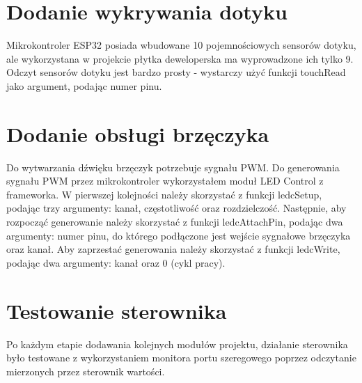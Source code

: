 \documentclass[11pt]{report}
\begin{document}
 \section{Dodanie wykrywania dotyku}
 Mikrokontroler ESP32 posiada wbudowane 10 pojemnościowych sensorów dotyku, ale wykorzystana w projekcie płytka deweloperska ma wyprowadzone ich tylko 9. Odczyt sensorów dotyku jest bardzo prosty - wystarczy użyć funkcji touchRead jako argument, podając numer pinu.
 
 \section{Dodanie obsługi brzęczyka}
 Do wytwarzania dźwięku brzęczyk potrzebuje sygnału PWM. Do generowania sygnału PWM przez mikrokontroler wykorzystałem moduł LED Control z frameworka. W pierwszej kolejności należy skorzystać z funkcji ledcSetup, podając trzy argumenty: kanał, częstotliwość oraz rozdzielczość. Następnie, aby rozpocząć generowanie należy skorzystać z funkcji ledcAttachPin, podając dwa argumenty: numer pinu, do którego podłączone jest wejście sygnałowe brzęczyka oraz kanał.
 Aby zaprzestać generowania należy skorzystać z funkcji ledcWrite, podając dwa argumenty: kanał oraz 0 (cykl pracy).
 
 \section{Testowanie sterownika}
 Po każdym etapie dodawania kolejnych modułów projektu, działanie sterownika było testowane z wykorzystaniem monitora portu szeregowego poprzez odczytanie mierzonych przez sterownik wartości.

 
\end{document}
